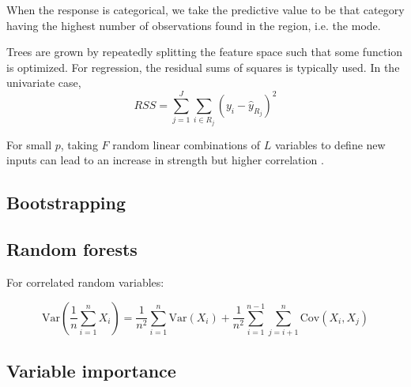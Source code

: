 When the response is categorical, we take the predictive value to be that category having the highest number of observations found in the region, i.e. the mode.

Trees are grown by repeatedly splitting the feature space such that some function is optimized. For regression, the residual sums of squares is typically used. In the univariate case,
\[ RSS=\sum_{j=1}^J\sum_{i\in R_j}(y_i - \hat{y}_{R_j})^2 \]

For small $p$, taking $F$ random linear combinations of $L$ variables to define new inputs can lead to an increase in strength but higher correlation \citep{breiman:2001}. \cite{segal:2011} \cite{death:2002}

\subsection{Bootstrapping}


\subsection{Random forests}

For correlated random variables:

\[ \mathrm{Var}\left(\frac{1}{n}\sum_{i=1}^nX_i\right) = \frac{1}{n^2}\sum_{i=1}^n\mathrm{Var}(X_i) + \frac{1}{n^2}\sum_{i=1}^{n-1}\sum_{j=i+1}^n\mathrm{Cov}(X_i,X_j) \]


\subsection{Variable importance}
